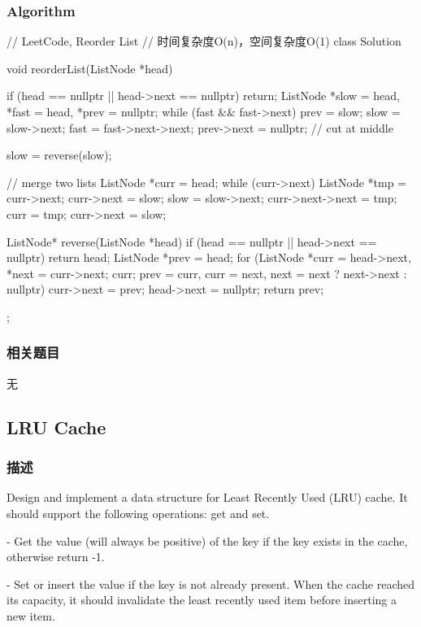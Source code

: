 \subsubsection{Algorithm}
\begin{Code}
	// LeetCode, Reorder List
	// 时间复杂度O(n)，空间复杂度O(1)
	class Solution {
		void reorderList(ListNode *head) {
			if (head == nullptr || head->next == nullptr) return;
			ListNode *slow = head, *fast = head, *prev = nullptr;
			while (fast && fast->next) {
				prev = slow;
				slow = slow->next;
				fast = fast->next->next;
			}
			prev->next = nullptr; // cut at middle
			
			slow = reverse(slow);
			
			// merge two lists
			ListNode *curr = head;
			while (curr->next) {
				ListNode *tmp = curr->next;
				curr->next = slow;
				slow = slow->next;
				curr->next->next = tmp;
				curr = tmp;
			}
			curr->next = slow;
		}
		
		ListNode* reverse(ListNode *head) {
			if (head == nullptr || head->next == nullptr) return head;
			ListNode *prev = head;
			for (ListNode *curr = head->next, *next = curr->next; curr;
				prev = curr, curr = next, next = next ? next->next : nullptr) 
				curr->next = prev;
			head->next = nullptr;
			return prev;
		}
	};
\end{Code}


\subsubsection{相关题目}
\begindot
\item 无
\myenddot


\subsection{LRU Cache}
\label{sec:LRU-Cachet}


\subsubsection{描述}
Design and implement a data structure for Least Recently Used (LRU) cache. It 
should support the following operations: get and set.

 - Get the value (will always be positive) of the key if the key 
exists in the cache, otherwise return -1.

 - Set or insert the value if the key is not already 
present. When the cache reached its capacity, it should invalidate the least 
recently used item before inserting a new item.


